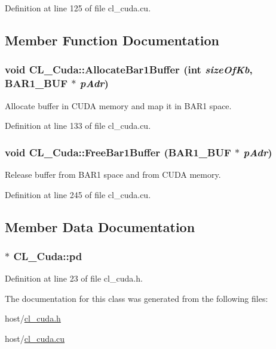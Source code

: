 Definition at line 125 of file cl\_\-cuda.cu.

\subsection{Member Function Documentation}
\hypertarget{classCL__Cuda_a2c2b6f65ee2226a8a11052a84fcebf83}{
\subsubsection[{AllocateBar1Buffer}]{\setlength{\rightskip}{0pt plus 5cm}void CL\_\-Cuda::AllocateBar1Buffer (int {\em sizeOfKb}, \/  {\bf BAR1\_\-BUF} $\ast$ {\em pAdr})}}
\label{classCL__Cuda_a2c2b6f65ee2226a8a11052a84fcebf83}


Allocate buffer in CUDA memory and map it in BAR1 space. 

Definition at line 133 of file cl\_\-cuda.cu.\hypertarget{classCL__Cuda_a2a9874acb9297efde377249468efa043}{
\subsubsection[{FreeBar1Buffer}]{\setlength{\rightskip}{0pt plus 5cm}void CL\_\-Cuda::FreeBar1Buffer ({\bf BAR1\_\-BUF} $\ast$ {\em pAdr})}}
\label{classCL__Cuda_a2a9874acb9297efde377249468efa043}


Release buffer from BAR1 space and from CUDA memory. 

Definition at line 245 of file cl\_\-cuda.cu.

\subsection{Member Data Documentation}
\hypertarget{classCL__Cuda_ac829b1e46585219ac2c30ccab6e7c9f8}{
\subsubsection[{pd}]{$\ast$ {\bf CL\_\-Cuda::pd}}}
\label{classCL__Cuda_ac829b1e46585219ac2c30ccab6e7c9f8}


Definition at line 23 of file cl\_\-cuda.h.

The documentation for this class was generated from the following files:\begin{DoxyCompactItemize}
\item 
host/\hyperlink{cl__cuda_8h}{cl\_\-cuda.h}\item 
host/\hyperlink{cl__cuda_8cu}{cl\_\-cuda.cu}\end{DoxyCompactItemize}

